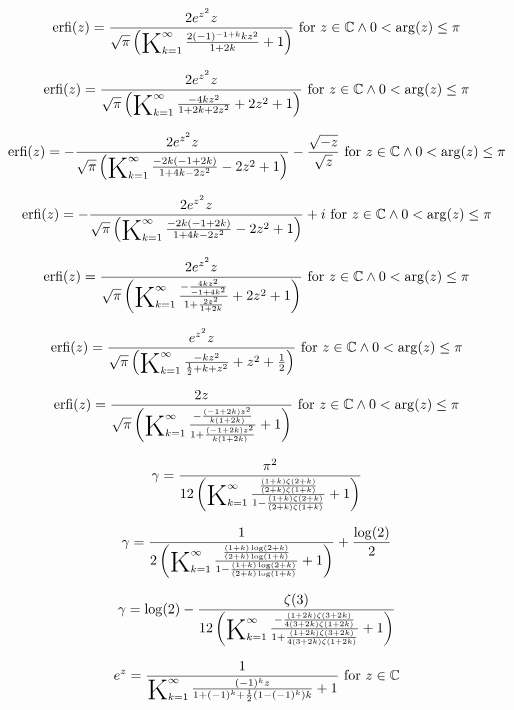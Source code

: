 \documentclass{article}
\newcommand{\bigK}{\mathop{\raisebox{-5pt}{\huge K}}}
\begin{document}
\[\text{erfi}(z)=\frac{2 e^{z^2} z}{\sqrt{\pi } \left(\bigK_{k=1}^{\infty}\frac{2 (-1)^{-1+k} k z^2}{1+2 k}+1\right)}\text{ for }z\in \mathbb{C}\land 0<\arg (z)\leq \pi\] 

\[\text{erfi}(z)=\frac{2 e^{z^2} z}{\sqrt{\pi } \left(\bigK_{k=1}^{\infty}\frac{-4 k z^2}{1+2 k+2 z^2}+2 z^2+1\right)}\text{ for }z\in \mathbb{C}\land 0<\arg (z)\leq \pi\] 

\[\text{erfi}(z)=-\frac{2 e^{z^2} z}{\sqrt{\pi } \left(\bigK_{k=1}^{\infty}\frac{-2 k (-1+2 k)}{1+4 k-2 z^2}-2 z^2+1\right)}-\frac{\sqrt{-z}}{\sqrt{z}}\text{ for }z\in \mathbb{C}\land 0<\arg (z)\leq \pi\] 

\[\text{erfi}(z)=-\frac{2 e^{z^2} z}{\sqrt{\pi } \left(\bigK_{k=1}^{\infty}\frac{-2 k (-1+2 k)}{1+4 k-2 z^2}-2 z^2+1\right)}+i\text{ for }z\in \mathbb{C}\land 0<\arg (z)\leq \pi\] 

\[\text{erfi}(z)=\frac{2 e^{z^2} z}{\sqrt{\pi } \left(\bigK_{k=1}^{\infty}\frac{-\frac{4 k z^2}{-1+4 k^2}}{1+\frac{2 z^2}{1+2 k}}+2 z^2+1\right)}\text{ for }z\in \mathbb{C}\land 0<\arg (z)\leq \pi\] 

\[\text{erfi}(z)=\frac{e^{z^2} z}{\sqrt{\pi } \left(\bigK_{k=1}^{\infty}\frac{-k z^2}{\frac{1}{2}+k+z^2}+z^2+\frac{1}{2}\right)}\text{ for }z\in \mathbb{C}\land 0<\arg (z)\leq \pi\] 

\[\text{erfi}(z)=\frac{2 z}{\sqrt{\pi } \left(\bigK_{k=1}^{\infty}\frac{-\frac{(-1+2 k) z^2}{k (1+2 k)}}{1+\frac{(-1+2 k) z^2}{k (1+2 k)}}+1\right)}\text{ for }z\in \mathbb{C}\land 0<\arg (z)\leq \pi\] 

\[\gamma =\frac{\pi ^2}{12 \left(\bigK_{k=1}^{\infty}\frac{\frac{(1+k) \zeta (2+k)}{(2+k) \zeta (1+k)}}{1-\frac{(1+k) \zeta (2+k)}{(2+k) \zeta (1+k)}}+1\right)}\] 

\[\gamma =\frac{1}{2 \left(\bigK_{k=1}^{\infty}\frac{\frac{(1+k) \log (2+k)}{(2+k) \log (1+k)}}{1-\frac{(1+k) \log (2+k)}{(2+k) \log (1+k)}}+1\right)}+\frac{\log (2)}{2}\] 

\[\gamma =\log (2)-\frac{\zeta (3)}{12 \left(\bigK_{k=1}^{\infty}\frac{-\frac{(1+2 k) \zeta (3+2 k)}{4 (3+2 k) \zeta (1+2 k)}}{1+\frac{(1+2 k) \zeta (3+2 k)}{4 (3+2 k) \zeta (1+2 k)}}+1\right)}\] 

\[e^z=\frac{1}{\bigK_{k=1}^{\infty}\frac{(-1)^k z}{1+(-1)^k+\frac{1}{2} \left(1-(-1)^k\right) k}+1}\text{ for }z\in \mathbb{C}\] 
\end{document}
